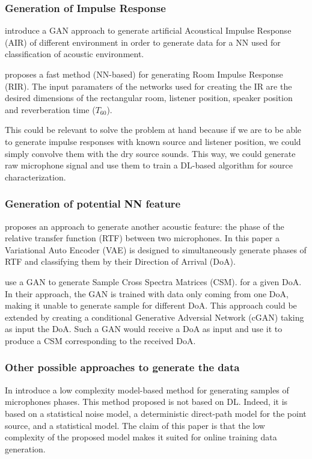 \documentclass{article}
\begin{document}
\subsubsection{Generation of Impulse Response}

\cite{papayiannis2019data} introduce a GAN approach to generate artificial Acoustical Impulse Response (AIR) of different environment in order to generate data for a NN used for classification of acoustic environment.

\cite{ratnarajah2021fast} proposes a fast method (NN-based) for generating Room Impulse Response (RIR). The input paramaters of the networks used for creating the IR are the desired dimensions of the rectangular room, listener position, speaker position and reverberation time ($T_{60}$).

This could be relevant to solve the problem at hand because if we are to be able to generate impulse responses with known source and listener position, we could simply convolve them with the dry source sounds. This way, we could generate raw microphone signal and use them to train a DL-based algorithm for source characterization.


\subsubsection{Generation of potential NN feature}

\cite{bianco2020semi} proposes an approach to generate another acoustic feature: the phase of the relative transfer function (RTF) between two microphones. In this paper a Variational Auto Encoder (VAE) is designed to simultaneously generate phases of RTF and classifying them by their Direction of Arrival (DoA).

\cite{gerstoft2020parametric} use a GAN to generate Sample Cross Spectra Matrices (CSM). for a given DoA. In their approach, the GAN is trained with data only coming from one DoA, making it unable to generate sample for different DoA. This approach could be extended by creating a conditional Generative Adversial Network (cGAN) taking as input the DoA. Such a GAN would receive a DoA as input and use it to produce a CSM corresponding to the received DoA.

\subsubsection{Other possible approaches to generate the data}

In \cite{hubner2021efficient} introduce a low complexity model-based method for generating samples of microphones phases. This method proposed is not based on DL. Indeed, it is based on a statistical noise model, a deterministic direct-path model for the point source, and a statistical model. The claim of this paper is that the low complexity of the proposed  model makes it suited for online training data generation. 
\end{document}

